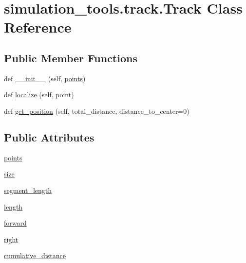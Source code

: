\hypertarget{classsimulation__tools_1_1track_1_1_track}{}\section{simulation\+\_\+tools.\+track.\+Track Class Reference}
\label{classsimulation__tools_1_1track_1_1_track}
\subsection*{Public Member Functions}
\begin{DoxyCompactItemize}
\item 
def \hyperlink{classsimulation__tools_1_1track_1_1_track_a688ef860ebacddc55c143c6202a3dab5}{\+\_\+\+\_\+init\+\_\+\+\_\+} (self, \hyperlink{classsimulation__tools_1_1track_1_1_track_ac6de34747fd382897e7f790cd9faf67c}{points})
\item 
def \hyperlink{classsimulation__tools_1_1track_1_1_track_a74c6566237436692a421615bd5cf9064}{localize} (self, point)
\item 
def \hyperlink{classsimulation__tools_1_1track_1_1_track_a65ae88cad753af6ebf71ae09fd110ac8}{get\+\_\+position} (self, total\+\_\+distance, distance\+\_\+to\+\_\+center=0)
\end{DoxyCompactItemize}
\subsection*{Public Attributes}
\begin{DoxyCompactItemize}
\item 
\hyperlink{classsimulation__tools_1_1track_1_1_track_ac6de34747fd382897e7f790cd9faf67c}{points}
\item 
\hyperlink{classsimulation__tools_1_1track_1_1_track_a69be8807eecacfd98981e206ea3a003f}{size}
\item 
\hyperlink{classsimulation__tools_1_1track_1_1_track_aa74dadec286ae8ad2f3399c6fd9e9fd9}{segment\+\_\+length}
\item 
\hyperlink{classsimulation__tools_1_1track_1_1_track_a24b60622edd3b0825f31fd6426d9380b}{length}
\item 
\hyperlink{classsimulation__tools_1_1track_1_1_track_ae944fe956579cafe73bf09d3a7c072bc}{forward}
\item 
\hyperlink{classsimulation__tools_1_1track_1_1_track_a668e3804fa2720790fb57f592c73c782}{right}
\item 
\hyperlink{classsimulation__tools_1_1track_1_1_track_a4513ffc3cdb1963bce98c678b093c40b}{cumulative\+\_\+distance}
\end{DoxyCompactItemize}


